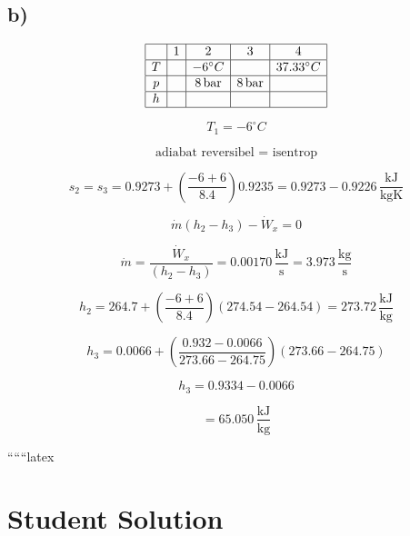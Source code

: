 

\subsection*{b)}

\[
\begin{array}{|c|c|c|c|c|}
\hline
 & 1 & 2 & 3 & 4 \\
\hline
T & & -6^\circ C & & 37.33^\circ C \\
\hline
p & & 8 \, \text{bar} & 8 \, \text{bar} & \\
\hline
h & & & & \\
\hline
\end{array}
\]

\[
T_1 = -6^\circ C
\]

\[
\text{adiabat reversibel = isentrop}
\]

\[
s_2 = s_3 = 0.9273 + \left( \frac{-6 + 6}{8.4} \right) 0.9235 = 0.9273 - 0.9226 \, \frac{\text{kJ}}{\text{kgK}}
\]

\[
\dot{m} (h_2 - h_3) - \dot{W}_x = 0
\]

\[
\dot{m} = \frac{\dot{W}_x}{(h_2 - h_3)} = 0.00170 \, \frac{\text{kJ}}{\text{s}} = 3.973 \, \frac{\text{kg}}{\text{s}}
\]

\[
h_2 = 264.7 + \left( \frac{-6 + 6}{8.4} \right) (274.54 - 264.54) = 273.72 \, \frac{\text{kJ}}{\text{kg}}
\]

\[
h_3 = 0.0066 + \left( \frac{0.932 - 0.0066}{273.66 - 264.75} \right) (273.66 - 264.75)
\]

\[
h_3 = 0.9334 - 0.0066
\]

\[
= 65.050 \, \frac{\text{kJ}}{\text{kg}}
\]

``````latex


\section*{Student Solution}